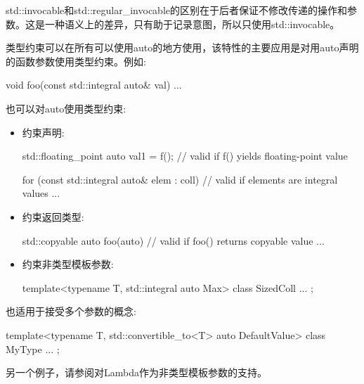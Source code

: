 std::invocable和std::regular\_invocable的区别在于后者保证不修改传递的操作和参数。这是一种语义上的差异，只有助于记录意图，所以只使用std::invocable。


类型约束可以在所有可以使用auto的地方使用，该特性的主要应用是对用auto声明的函数参数使用类型约束。例如:

\begin{cpp}
void foo(const std::integral auto& val)
{
	...
}
\end{cpp}

也可以对auto使用类型约束:

\begin{itemize}
\item
约束声明:

\begin{cpp}
std::floating_point auto val1 = f(); // valid if f() yields floating-point value

for (const std::integral auto& elem : coll) { // valid if elements are integral values
	...
}
\end{cpp}

\item
约束返回类型:

\begin{cpp}
std::copyable auto foo(auto) { // valid if foo() returns copyable value
	...
}
\end{cpp}

\item
约束非类型模板参数:

\begin{cpp}
template<typename T, std::integral auto Max>
class SizedColl {
	...
};
\end{cpp}
\end{itemize}

也适用于接受多个参数的概念:

\begin{cpp}
template<typename T, std::convertible_to<T> auto DefaultValue>
class MyType {
	...
};
\end{cpp}

另一个例子，请参阅对Lambda作为非类型模板参数的支持。












